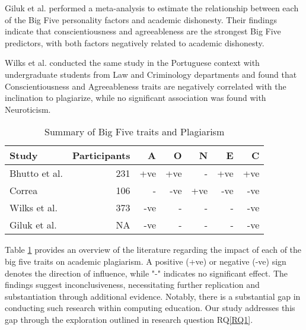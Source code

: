 Giluk et al.\cite{Giluk2015BigFP} performed a meta-analysis to estimate the relationship between each of the Big Five personality factors and academic dishonesty. Their findings indicate that conscientiousness and agreeableness are the strongest Big Five predictors, with both factors negatively related to academic dishonesty.

Wilks et al. \cite{Wilks2016-WILPTA-3} conducted the same study in the Portuguese context with undergraduate students from Law and Criminology departments and found that Conscientiousness and Agreeableness traits are negatively correlated with the inclination to plagiarize, while no significant association was found with Neuroticism. 

\begin{table}[h]
  \centering
  \caption{Summary of Big Five traits and Plagiarism \\\label{tab:litSUmmary}}
    \vspace{-12pt}
  \begin{tabular}{p{2cm}rrrrrr}
    \toprule
    Study & Participants & A & O & N & E & C \\\midrule
    Bhutto et al.\cite{Bhutto2019ACS} & 231 & +ve & +ve & - & +ve & +ve \\
    Correa\cite{ChileanUniver} & 106 & - & -ve & +ve & -ve & -ve \\
    Wilks et al.\cite{Wilks2016-WILPTA-3} & 373 & -ve & - & - & - & -ve \\
    Giluk et al.\cite{Giluk2015BigFP} & NA & -ve & - & - & - & -ve \\ \bottomrule
  \end{tabular}
  \vspace{-4pt}
\end{table}

Table \ref{tab:litSUmmary} provides an overview of the literature regarding the impact of each of the big five traits on academic plagiarism. A positive (+ve) or negative (-ve) sign denotes the direction of influence, while "-" indicates no significant effect. The findings suggest inconclusiveness, necessitating further replication and substantiation through additional evidence. Notably, there is a substantial gap in conducting such research within computing education. Our study addresses this gap through the exploration outlined in research question RQ\ref{RQ1}.


